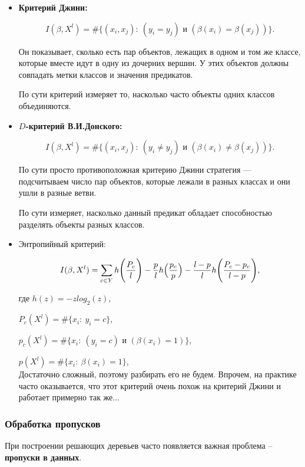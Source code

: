 \documentclass{article}
\begin{document}
\begin{itemize}
\item \textbf{Критерий Джини:}

$$I(\beta, X^l) = \#\{(x_i, x_j):\ (y_i = y_j) \text{ и } (\beta(x_i) = \beta(x_j))\}.$$

Он показывает, сколько есть пар объектов, лежащих в одном и том же классе, которые вместе идут в одну из дочерних вершин. У этих объектов должны совпадать метки классов и значения предикатов.

По сути критерий измеряет то, насколько часто объекты одних классов объединяются.

\item $D$\textbf{-критерий В.И.Донского:}

$$I(\beta, X^l) = \#\{(x_i, x_j):\ (y_i \not=y_j) \text{ и } (\beta(x_i) \not= \beta(x_j))\}.$$

По сути просто противоположная критерию Джини стратегия --- подсчитываем число пар объектов, которые лежали в разных классах и они ушли в разные ветви.

По сути измеряет, насколько данный предикат обладает способностью разделять объекты разных классов.

\item Энтропийный критерий:

$$I(\beta, X^l) = 
\sum\limits_{c \in Y} h\Biggl(\frac{P_c}{l}\Biggr)
- \frac{p}{l}h\Bigl(\frac{p_c}{p}\Bigr)
- \frac{l - p}{l}h\Biggl(\frac{P_c - p_c}{l - p}\Biggr),$$

где $h(z) = -z log_2(z)$,

$P_c(X^l) = \#\{x_i:\ y_i = c\}$,

$p_c(X^l) = \#\{x_i:\ (y_i = c) \text{ и } (\beta(x_i) = 1)\}$,

$p(X^l) = \#\{x_i:\ \beta(x_i) = 1\}$,
\\

Достаточно сложный, поэтому разбирать его не будем. Впрочем, на практике часто оказывается, что этот критерий очень похож на критерий Джини и работает примерно так же...

\end{itemize}

\subsubsection{Обработка пропусков}

При построении решающих деревьев часто появляется важная проблема -- \textbf{пропуски в данных}.
\end{document}
